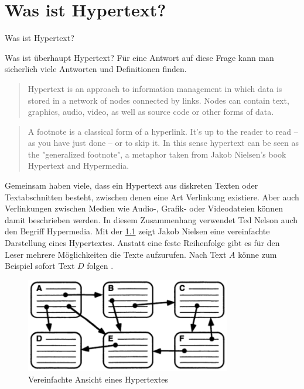 \chapter{Was ist Hypertext?}
\label{ch:Was ist Hypertext?}

\begin{section}{Was ist Hypertext?}
\label{sec:big_brother}

Was ist überhaupt Hypertext? Für eine Antwort auf diese Frage kann man sicherlich viele Antworten und Definitionen finden.

\begin{quote}
    \glqq [...] Hypertext is an approach to information management in which data is stored in a network of nodes connected by links. Nodes can contain text, graphics, audio, video, as well as source code or other forms of data.\grqq{ }\cite{Smith1988}
\end{quote}

\begin{quote}
    \glqq A footnote is a classical form of a hyperlink. It’s up to the reader to read – as you have just done – or to skip it. In this sense hypertext can be seen as the "generalized footnote", a metaphor taken from Jakob Nielsen’s book Hypertext and Hypermedia.\grqq{ }\cite{Nielsen1990}
\end{quote}
 
Gemeinsam haben viele, dass ein Hypertext aus diskreten Texten oder Textabschnitten besteht, zwischen denen eine Art Verlinkung existiere. Aber auch Verlinkungen zwischen Medien wie Audio-, Grafik- oder Videodateien können damit beschrieben werden. In diesem Zusammenhang verwendet Ted Nelson auch den Begriff \glqq Hypermedia\grqq{ }\cite{Nelson1965}. Mit der \ref{fig:nielsenLink} zeigt Jakob Nielsen eine vereinfachte Darstellung eines Hypertextes. Anstatt eine feste Reihenfolge gibt es für den Leser mehrere Möglichkeiten die Texte aufzurufen. Nach Text $A$ könne zum Beispiel sofort Text $D$ folgen \cite[S.1]{Nielsen1995}. 

\begin{figure}[!ht]
	\centering
	\includegraphics[width=0.8\textwidth]{image/nielsenLink}
	\caption{Vereinfachte Ansicht eines Hypertextes \cite[S.1]{Nielsen1995}}
	\label{fig:nielsenLink}
\end{figure}



\end{section}
